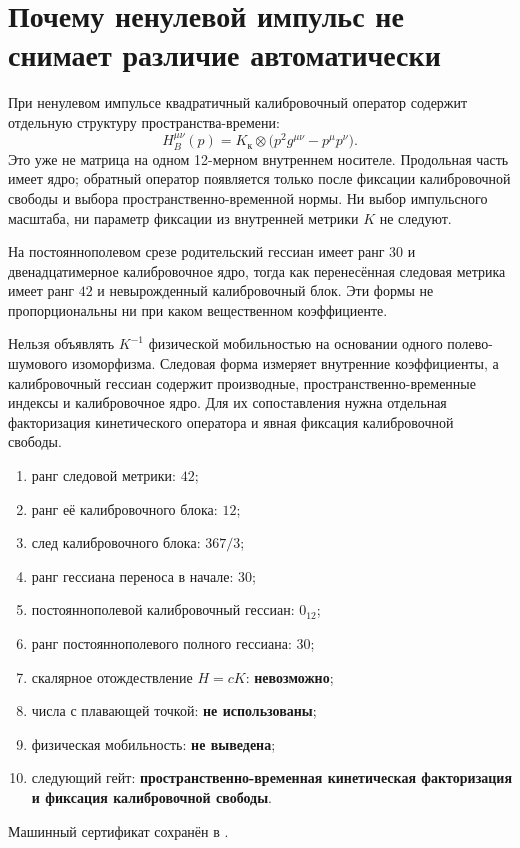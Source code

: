 \section{Почему ненулевой импульс не снимает различие автоматически}

При ненулевом импульсе квадратичный калибровочный оператор содержит
отдельную структуру пространства-времени:
\begin{equation}
 H_B^{\mu\nu}(p)
 =K_{\text{к}}\otimes
 \bigl(p^2g^{\mu\nu}-p^\mu p^\nu\bigr).
 \label{eq:v8-parent-comparison-momentum-hessian}
\end{equation}
Это уже не матрица на одном 12-мерном внутреннем носителе. Продольная часть
имеет ядро; обратный оператор появляется только после фиксации
калибровочной свободы и выбора пространственно-временной нормы. Ни выбор
импульсного масштаба, ни параметр фиксации из внутренней метрики $K$ не
следуют.

\begin{theorem}
На постояннополевом срезе родительский гессиан имеет ранг $30$ и
двенадцатимерное калибровочное ядро, тогда как перенесённая следовая метрика
имеет ранг $42$ и невырожденный калибровочный блок. Эти формы не
пропорциональны ни при каком вещественном коэффициенте.
\end{theorem}

\begin{nogocriterion}
Нельзя объявлять $K^{-1}$ физической мобильностью на основании одного
полево-шумового изоморфизма. Следовая форма измеряет внутренние
коэффициенты, а калибровочный гессиан содержит производные,
пространственно-временные индексы и калибровочное ядро. Для их сопоставления
нужна отдельная факторизация кинетического оператора и явная фиксация
калибровочной свободы.
\end{nogocriterion}

\begin{protocol}
\begin{enumerate}
 \item ранг следовой метрики: \textbf{$42$};
 \item ранг её калибровочного блока: \textbf{$12$};
 \item след калибровочного блока: \textbf{$367/3$};
 \item ранг гессиана переноса в начале: \textbf{$30$};
 \item постояннополевой калибровочный гессиан: \textbf{$0_{12}$};
 \item ранг постояннополевого полного гессиана: \textbf{$30$};
 \item скалярное отождествление $H=cK$: \textbf{невозможно};
 \item числа с плавающей точкой: \textbf{не использованы};
 \item физическая мобильность: \textbf{не выведена};
 \item следующий гейт: \textbf{пространственно-временная кинетическая
       факторизация и фиксация калибровочной свободы}.
\end{enumerate}
\end{protocol}

Машинный сертификат сохранён в
.